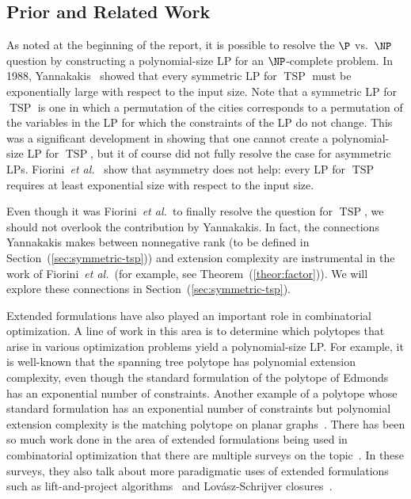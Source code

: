 \documentclass{article}
\makeatletter
\theoremstyle{definition}
\theoremstyle{remark}
\newcommand{\cetal}{\textit{et al.\@}}  %
\newcommand{\etal}{\textit{et al.\@\ }}  %
\newcommand{\TSP}{\operatorname{TSP}}
\makeatother
\begin{document}
\subsection{Prior and Related Work}\label{sec:Yannakakis}

As noted at the beginning of the report, it is possible to resolve the $\P$ vs.\ $\NP$ question by constructing a polynomial-size LP for an $\NP$-complete problem. In 1988, Yannakakis~\cite{yannakakis} showed that every symmetric LP for $\TSP$ must be exponentially large with respect to the input size. Note that a symmetric LP for $\TSP$ is one in which a permutation of the cities corresponds to a permutation of the variables in the LP for which the constraints of the LP do not change. This was a significant development in showing that one cannot create a polynomial-size LP for $\TSP$, but it of course did not fully resolve the case for asymmetric LPs. Fiorini~\cetal~\cite{fiorini} show that asymmetry does not help: every LP for $\TSP$ requires at least exponential size with respect to the input size. 

Even though it was Fiorini~\etal to finally resolve the question for $\TSP$, we should not overlook the contribution by Yannakakis. In fact, the connections Yannakakis makes between nonnegative rank (to be defined in Section~(\ref{sec:symmetric-tsp})) and extension complexity are instrumental in the work of Fiorini~\etal (for example, see Theorem~(\ref{theor:factor})). We will explore these connections in Section~(\ref{sec:symmetric-tsp}).

Extended formulations have also played an important role in combinatorial optimization. A line of work in this area is to determine which polytopes that arise in various optimization problems yield a polynomial-size LP. For example, it is well-known that the spanning tree polytope has polynomial extension complexity, even though the standard formulation of the polytope of Edmonds~\cite{edmonds} has an exponential number of constraints. Another example of a polytope whose standard formulation has an exponential number of constraints but polynomial extension complexity is the matching polytope on planar graphs~\cite{barahona}. There has been so much work done in the area of extended formulations being used in combinatorial optimization that there are multiple surveys on the topic~\cite{conforti,vanderbeck,kaibel}. In these surveys, they also talk about more paradigmatic uses of extended formulations such as lift-and-project algorithms~\cite{balas} and Lov{\'a}sz-Schrijver closures~\cite{lovasz}.
\end{document}
